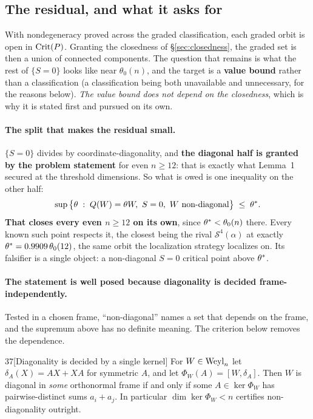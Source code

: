 \subsection{The residual, and what it asks for}\label{sec:outside}

With nondegeneracy proved across the graded classification, each graded orbit is open in $\mathrm{Crit}(P)$. Granting the closedness of \S\ref{sec:closedness}, the graded set is then a union of connected components. The question that remains is what the rest of $\{S=0\}$ looks like near $\theta_0(n)$, and the target is a \textbf{value bound} rather than a classification (a classification being both unavailable and unnecessary, for the reasons below). \emph{The value bound does not depend on the closedness}, which is why it is stated first and pursued on its own.

\paragraph{The split that makes the residual small.} $\{S=0\}$ divides by coordinate-diagonality, and \textbf{the diagonal half is granted by the problem statement} for even $n\ge12$: that is exactly what Lemma~1 secured at the threshold dimensions. So what is owed is one inequality on the other half:
\[
\sup\big\{\theta\;:\;Q(W)=\theta W,\ S=0,\ W\text{ non-diagonal}\big\}\;\le\;\thstar .
\]
\textbf{That closes every even $n\ge12$ on its own}, since $\theta^{*}<\theta_0(n)$ there. Every known such point respects it, the closest being the rival $\mathcal S^4(\alpha)$ at exactly $\theta^{*}=0.9909\,\theta_0(12)$, the same orbit the localization strategy localizes on. Its falsifier is a single object: a non-diagonal $S=0$ critical point above $\theta^{*}$.

\paragraph{The statement is well posed because diagonality is decided frame-independently.} Tested in a chosen frame, ``non-diagonal'' names a set that depends on the frame, and the supremum above has no definite meaning. The criterion below removes the dependence.

\begin{Lem}{37}[Diagonality is decided by a single kernel]
For $W\in\mathrm{Weyl}_n$ let $\delta_A(X)=AX+XA$ for symmetric $A$, and let $\Phi_W(A)=[W,\delta_A]$. Then $W$ is diagonal in \emph{some} orthonormal frame if and only if some $A\in\ker\Phi_W$ has pairwise-distinct sums $a_i+a_j$. In particular $\dim\ker\Phi_W<n$ certifies non-diagonality outright.
\end{Lem}

